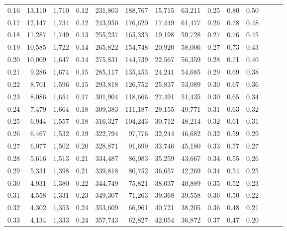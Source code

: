 \begin{tabular}{rrrrrrrrrrrrrr}
0.16 &  13,110 &  1,710 &  0.12 &  231,803 &  188,767 &  15,715 &  63,211 &  0.25 &  0.80 &      0.50 \\
0.17 &  12,147 &  1,734 &  0.12 &  243,950 &  176,620 &  17,449 &  61,477 &  0.26 &  0.78 &      0.48 \\
0.18 &  11,287 &  1,749 &  0.13 &  255,237 &  165,333 &  19,198 &  59,728 &  0.27 &  0.76 &      0.45 \\
0.19 &  10,585 &  1,722 &  0.14 &  265,822 &  154,748 &  20,920 &  58,006 &  0.27 &  0.73 &      0.43 \\
0.20 &  10,009 &  1,647 &  0.14 &  275,831 &  144,739 &  22,567 &  56,359 &  0.28 &  0.71 &      0.40 \\
0.21 &   9,286 &  1,674 &  0.15 &  285,117 &  135,453 &  24,241 &  54,685 &  0.29 &  0.69 &      0.38 \\
0.22 &   8,701 &  1,596 &  0.15 &  293,818 &  126,752 &  25,837 &  53,089 &  0.30 &  0.67 &      0.36 \\
0.23 &   8,086 &  1,654 &  0.17 &  301,904 &  118,666 &  27,491 &  51,435 &  0.30 &  0.65 &      0.34 \\
0.24 &   7,479 &  1,664 &  0.18 &  309,383 &  111,187 &  29,155 &  49,771 &  0.31 &  0.63 &      0.32 \\
0.25 &   6,944 &  1,557 &  0.18 &  316,327 &  104,243 &  30,712 &  48,214 &  0.32 &  0.61 &      0.31 \\
0.26 &   6,467 &  1,532 &  0.19 &  322,794 &   97,776 &  32,244 &  46,682 &  0.32 &  0.59 &      0.29 \\
0.27 &   6,077 &  1,502 &  0.20 &  328,871 &   91,699 &  33,746 &  45,180 &  0.33 &  0.57 &      0.27 \\
0.28 &   5,616 &  1,513 &  0.21 &  334,487 &   86,083 &  35,259 &  43,667 &  0.34 &  0.55 &      0.26 \\
0.29 &   5,331 &  1,398 &  0.21 &  339,818 &   80,752 &  36,657 &  42,269 &  0.34 &  0.54 &      0.25 \\
0.30 &   4,931 &  1,380 &  0.22 &  344,749 &   75,821 &  38,037 &  40,889 &  0.35 &  0.52 &      0.23 \\
0.31 &   4,558 &  1,331 &  0.23 &  349,307 &   71,263 &  39,368 &  39,558 &  0.36 &  0.50 &      0.22 \\
0.32 &   4,302 &  1,353 &  0.24 &  353,609 &   66,961 &  40,721 &  38,205 &  0.36 &  0.48 &      0.21 \\
0.33 &   4,134 &  1,333 &  0.24 &  357,743 &   62,827 &  42,054 &  36,872 &  0.37 &  0.47 &      0.20 \\

\end{tabular}
